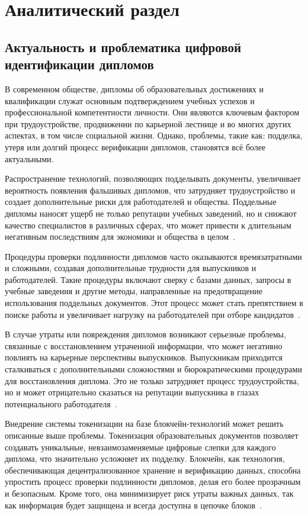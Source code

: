 \section{Аналитический раздел}
\label{sec:analytics}

\subsection{Актуальность и проблематика цифровой идентификации дипломов}

В современном обществе, дипломы об образовательных достижениях и квалификации служат основным подтверждением учебных успехов и профессиональной компетентности личности. Они являются ключевым фактором при трудоустройстве, продвижении по карьерной лестнице и во многих других аспектах, в том числе социальной жизни. Однако, проблемы, такие как: подделка, утеря или долгий процесс верификации дипломов, становятся всё более актуальными.

Распространение технологий, позволяющих подделывать документы, увеличивает вероятность появления фальшивых дипломов, что затрудняет трудоустройство и создает дополнительные риски для работодателей и общества. Поддельные дипломы наносят ущерб не только репутации учебных заведений, но и снижают качество специалистов в различных сферах, что может привести к длительным негативным последствиям для экономики и общества в целом~\cite{bib:if_fake_diploma, bib:tzh_fake_diploma}.

Процедуры проверки подлинности дипломов часто оказываются времязатратными и сложными, создавая дополнительные трудности для выпускников и работодателей. Такие процедуры включают сверку с базами данных, запросы в учебные заведения и другие методы, направленные на предотвращение использования поддельных документов. Этот процесс может стать препятствием в поиске работы и увеличивает нагрузку на работодателей при отборе кандидатов~\cite{bib:diploma_check}.

В случае утраты или повреждения дипломов возникают серьезные проблемы, связанные с восстановлением утраченной информации, что может негативно повлиять на карьерные перспективы выпускников. Выпускникам приходится сталкиваться с дополнительными сложностями и бюрократическими процедурами для восстановления диплома. Это не только затрудняет процесс трудоустройства, но и может отрицательно сказаться на репутации выпускника в глазах потенциального работодателя~\cite{bib:cp_diploma_reissue, bib:iz_diploma_reissue}.

Внедрение системы токенизации на базе блокчейн-технологий может решить описанные выше проблемы. Токенизация образовательных документов позволяет создавать уникальные, невзаимозаменяемые цифровые слепки для каждого диплома, что значительно усложняет их подделку. Блокчейн, как технология, обеспечивающая децентрализованное хранение и верификацию данных, способна упростить процесс проверки подлинности дипломов, делая его более прозрачным и безопасным. Кроме того, она минимизирует риск утраты важных данных, так как информация будет защищена и всегда доступна в цепочке блоков~\cite{bib:tadviser_digital_diploma}.

